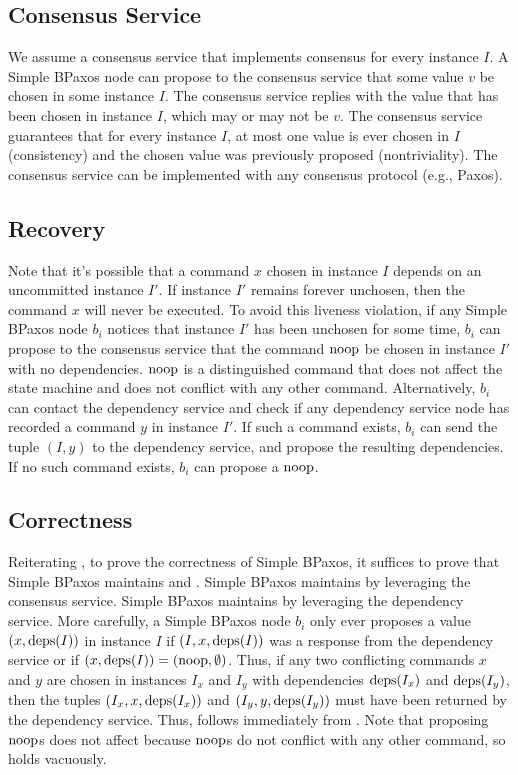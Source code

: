 \subsection{Consensus Service}
We assume a consensus service that implements consensus for every instance $I$.
A Simple BPaxos node can propose to the consensus service that some value $v$
be chosen in some instance $I$. The consensus service replies with the value
that has been chosen in instance $I$, which may or may not be $v$. The
consensus service guarantees that for every instance $I$, at most one value is
ever chosen in $I$ (consistency) and the chosen value was previously proposed
(nontriviality). The consensus service can be implemented with any consensus
protocol (e.g., Paxos).

\subsection{Recovery}
Note that it's possible that a command $x$ chosen in instance $I$ depends on an
uncommitted instance $I'$. If instance $I'$ remains forever unchosen, then the
command $x$ will never be executed. To avoid this liveness violation, if any
Simple BPaxos node $b_i$ notices that instance $I'$ has been unchosen for some
time, $b_i$ can propose to the consensus service that the command $\text{noop}$ be
chosen in instance $I'$ with no dependencies. $\text{noop}$ is a distinguished
command that does not affect the state machine and does not conflict with any
other command.
%
Alternatively, $b_i$ can contact the dependency service and check if any
dependency service node has recorded a command $y$ in instance $I'$. If such a
command exists, $b_i$ can send the tuple $(I, y)$ to the dependency service,
and propose the resulting dependencies. If no such command exists, $b_i$ can
propose a $\text{noop}$.

\subsection{Correctness}
Reiterating , to prove the correctness of Simple
BPaxos, it suffices to prove that Simple BPaxos maintains
 and .
%
Simple BPaxos maintains  by leveraging the consensus
service. Simple BPaxos maintains  by leveraging the
dependency service. More carefully, a Simple BPaxos node $b_i$ only ever
proposes a value $(x, \text{deps}(I))$ in instance $I$ if $(I, x, \text{deps}(I))$ was a
response from the dependency service or if $(x, \text{deps}(I)) = (\text{noop},
\emptyset)$. Thus, if any two conflicting commands $x$ and $y$ are chosen in
instances $I_x$ and $I_y$ with dependencies $\text{deps}(I_x)$ and $\text{deps}(I_y)$, then
the tuples $(I_x, x, \text{deps}(I_x))$ and $(I_y, y, \text{deps}(I_y))$ must have been
returned by the dependency service. Thus,  follows
immediately from . Note that proposing $\text{noop}{}$s
does not affect  because $\text{noop}$s do not conflict
with any other command, so  holds vacuously.
